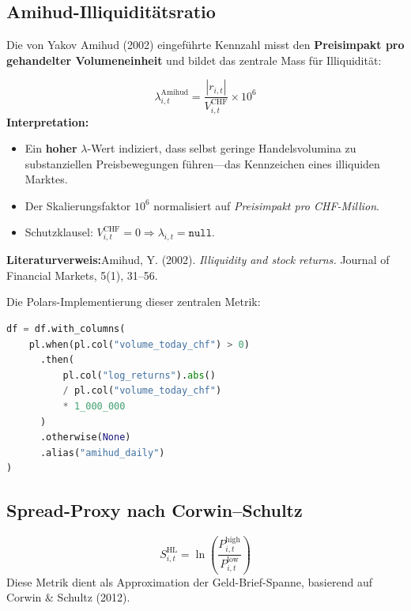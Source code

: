 \documentclass[11pt, a4paper, oneside, openany]{report}
\newcommand{\code}[1]{\texttt{\small\textcolor{DeepNavy}{#1}}}
\begin{document}
\subsection{Amihud-Illiquiditätsratio}

Die von Yakov Amihud (2002) eingeführte Kennzahl misst den \textbf{Preisimpakt pro gehandelter Volumeneinheit} und bildet das zentrale Mass für Illiquidität:

\begin{mathbox}
\[
  \boxed{\;\lambda_{i,t}^{\text{Amihud}} = \frac{|r_{i,t}|}{V_{i,t}^{\text{CHF}}} \times 10^{6}\;}
\]
\textbf{Interpretation:}
\begin{itemize}
  \item Ein \textbf{hoher} $\lambda$-Wert indiziert, dass selbst geringe Handelsvolumina zu substanziellen Preisbewegungen führen\;---\;das Kennzeichen eines illiquiden Marktes.
  \item Der Skalierungsfaktor $10^6$ normalisiert auf \textit{Preisimpakt pro CHF-Million}.
  \item Schutzklausel: $V_{i,t}^{\text{CHF}} = 0 \Rightarrow \lambda_{i,t} = \texttt{null}$.
\end{itemize}

\textbf{Literaturverweis:}\;Amihud, Y. (2002). \textit{Illiquidity and stock returns.} Journal of Financial Markets, 5(1), 31--56.
\end{mathbox}

\noindent Die Polars-Implementierung dieser zentralen Metrik:

\begin{lstlisting}[language=Python, caption={Amihud-Ratio in Polars (\code{metrics.py})}]
df = df.with_columns(
    pl.when(pl.col("volume_today_chf") > 0)
      .then(
          pl.col("log_returns").abs()
          / pl.col("volume_today_chf")
          * 1_000_000
      )
      .otherwise(None)
      .alias("amihud_daily")
)
\end{lstlisting}

\subsection{Spread-Proxy nach Corwin--Schultz}

\begin{mathbox}
\[
  S_{i,t}^{\text{HL}} = \ln\!\left(\frac{P_{i,t}^{\text{high}}}{P_{i,t}^{\text{low}}}\right)
\]
Diese Metrik dient als Approximation der Geld-Brief-Spanne, basierend auf Corwin \& Schultz (2012).
\end{mathbox}
\end{document}

